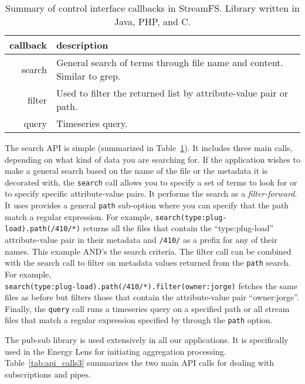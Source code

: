 \begin{table}[h]
\begin{center}
\begin{tabular}{| r | l |}
	\hline
	\textbf{callback} & \textbf{description} \\ \hline
	search & General search of terms through file name and content.  Similar to grep.    \\ \hline

	filter & Used to filter the returned list by attribute-value pair or path.    \\ \hline

	query & Timeseries query.    \\ \hline

\end{tabular}
\caption{Summary of control interface callbacks in StreamFS.  Library written in Java, PHP, and C.}
\label{tab:api_calls2}
\end{center}
\end{table}

The search API is simple (summarized in Table~\ref{tab:api_calls2}).  It includes three main calls, depending 
on what kind of data you are searching for.  
If the application wishes to make a general search based on the name of the file or the metadata it is decorated with, 
the \texttt{search} call allows you to specify 
a set of terms to look for or to specify specific attribute-value pairs.  It performs the search as a \emph{filter-forward}.
It uses provides a general \texttt{path} sub-option where you can specify that the path match a regular expression.
For example, \texttt{search(type:plug-load).path(/410/*)} returns all the files that contain the ``type:plug-load''
attribute-value pair in their metadata and \texttt{/410/} as a prefix for any of their names.  This example 
AND's the search criteria. 
The filter call can be combined with the search call to filter on metadata values returned from the \texttt{path} search.
For example, \\ \texttt{search(type:plug-load).path(/410/*).filter(owner:jorge)} 
fetches the same files as before but filters those that contain the attribute-value pair ``owner:jorge''.
Finally, the \texttt{query} call runs a timeseries query on a specified path or all stream files
that match a regular expression specified by through the \texttt{path} option.

The pub-sub library is used extensively in all our applications.  It is specifically used in 
the Energy Lens for initiating aggregation processing.  Table~\ref{tab:api_calls3} summarizes
the two main API calls for dealing with subscriptions and pipes.


